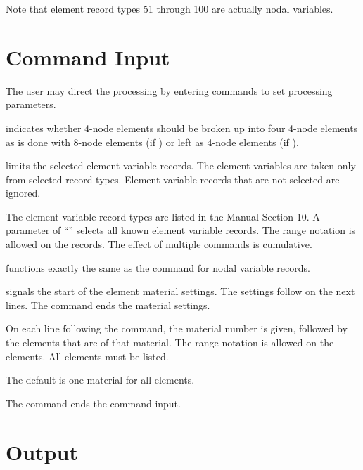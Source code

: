 Note that element record types 51 through 100 are actually nodal
variables.

\chapter{Command Input} \label{chap:command}

The user may direct the processing by entering commands to set
processing parameters.



 {
 indicates whether 4-node elements should be broken up into
four 4-node elements as is done with 8-node elements (if ) or
left as 4-node elements (if ).
}

 {
 limits the selected element variable records. The element
variables are taken only from selected record types. Element variable
records that are not selected are ignored.

The element variable record types are listed in the  Manual
Section 10. A parameter of ``'' selects all known element
variable records. The range notation is allowed on the records. The
effect of multiple  commands is cumulative.
}

 {
 functions exactly the same as the  command for
nodal variable records.
}

 {
 signals the start of the element material settings. The
settings follow on the next lines. The  command ends the
material settings.

On each line following the  command, the material number
is given, followed by the elements that are of that material. The range
notation is allowed on the elements. All elements must be listed.

The default is one material for all elements.
}

 {
The  command ends the command input.
}

\chapter{Output} \label{chap:output}
%
\newcommand{\errmsg}[2]{
   {\sf #1}
   \topicbegin \negmedskip {#2} \topicend
   }

